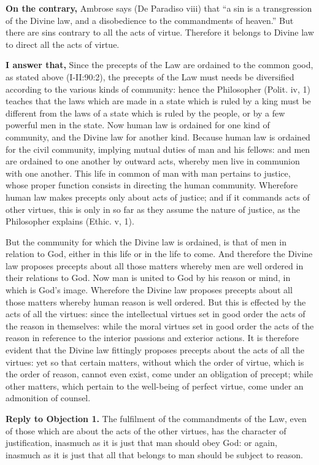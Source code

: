 \textbf{On the contrary,} Ambrose says (De Paradiso viii) that ``a sin is a transgression of the Divine law, and a disobedience to the commandments of heaven.'' But there are sins contrary to all the acts of virtue. Therefore it belongs to Divine law to direct all the acts of virtue.

\textbf{I answer that,} Since the precepts of the Law are ordained to the common good, as stated above (I-II:90:2), the precepts of the Law must needs be diversified according to the various kinds of community: hence the Philosopher (Polit. iv, 1) teaches that the laws which are made in a state which is ruled by a king must be different from the laws of a state which is ruled by the people, or by a few powerful men in the state. Now human law is ordained for one kind of community, and the Divine law for another kind. Because human law is ordained for the civil community, implying mutual duties of man and his fellows: and men are ordained to one another by outward acts, whereby men live in communion with one another. This life in common of man with man pertains to justice, whose proper function consists in directing the human community. Wherefore human law makes precepts only about acts of justice; and if it commands acts of other virtues, this is only in so far as they assume the nature of justice, as the Philosopher explains (Ethic. v, 1).

But the community for which the Divine law is ordained, is that of men in relation to God, either in this life or in the life to come. And therefore the Divine law proposes precepts about all those matters whereby men are well ordered in their relations to God. Now man is united to God by his reason or mind, in which is God's image. Wherefore the Divine law proposes precepts about all those matters whereby human reason is well ordered. But this is effected by the acts of all the virtues: since the intellectual virtues set in good order the acts of the reason in themselves: while the moral virtues set in good order the acts of the reason in reference to the interior passions and exterior actions. It is therefore evident that the Divine law fittingly proposes precepts about the acts of all the virtues: yet so that certain matters, without which the order of virtue, which is the order of reason, cannot even exist, come under an obligation of precept; while other matters, which pertain to the well-being of perfect virtue, come under an admonition of counsel.

\textbf{Reply to Objection 1.} The fulfilment of the commandments of the Law, even of those which are about the acts of the other virtues, has the character of justification, inasmuch as it is just that man should obey God: or again, inasmuch as it is just that all that belongs to man should be subject to reason.

